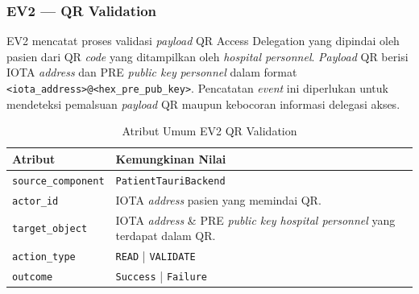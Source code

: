 \subsubsection{EV2 --- QR Validation}
\label{subsec:ev2-qr-validation}

EV2 mencatat proses validasi \textit{payload} QR Access Delegation yang dipindai
oleh pasien dari QR \textit{code} yang ditampilkan oleh \textit{hospital personnel}.
\textit{Payload} QR berisi IOTA \textit{address} dan PRE \textit{public key}
\textit{personnel} dalam format \texttt{<iota\_address>@<hex\_pre\_pub\_key>}.
Pencatatan \textit{event} ini diperlukan untuk mendeteksi pemalsuan
\textit{payload} QR maupun kebocoran informasi delegasi akses.

\begin{table}[htbp]
\centering
\caption{Atribut Umum EV2 QR Validation}
\label{tab:ev2-umum}
\renewcommand{\arraystretch}{1.3}
\begin{tabular}{|p{3.5cm}|p{8.5cm}|}
\hline
\textbf{Atribut} & \textbf{Kemungkinan Nilai} \\
\hline
\texttt{source\_component} &
\texttt{PatientTauriBackend} \\
\hline
\texttt{actor\_id} &
IOTA \textit{address} pasien yang memindai QR. \\
\hline
\texttt{target\_object} &
IOTA \textit{address} \& PRE \textit{public key hospital personnel} yang
terdapat dalam QR. \\
\hline
\texttt{action\_type} &
\texttt{READ} | \texttt{VALIDATE} \\
\hline
\texttt{outcome} &
\texttt{Success} | \texttt{Failure} \\
\hline
\end{tabular}
\end{table}

